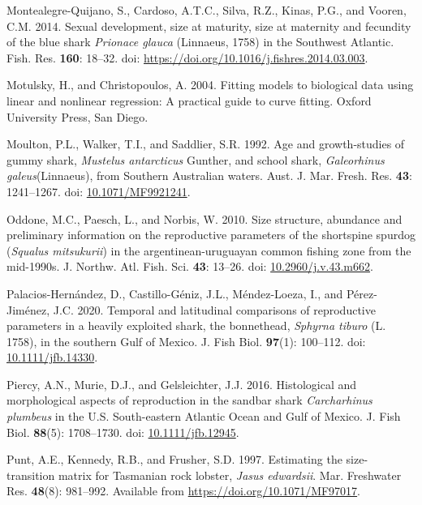 \documentclass[
]{article}
\newenvironment{CSLReferences}%
  {}%
  {\par}
\begin{document}
\begin{CSLReferences}{1}{0}
Montealegre-Quijano, S., Cardoso, A.T.C., Silva, R.Z., Kinas, P.G., and Vooren, C.M. 2014. Sexual development, size at maturity, size at maternity and fecundity of the blue shark \emph{{Prionace} glauca} ({Linnaeus}, 1758) in the {Southwest} {Atlantic}. Fish. Res. \textbf{160}: 18--32. doi: \url{https://doi.org/10.1016/j.fishres.2014.03.003}.

Motulsky, H., and Christopoulos, A. 2004. Fitting models to biological data using linear and nonlinear regression: A practical guide to curve fitting. Oxford University Press, San Diego.

Moulton, P.L., Walker, T.I., and Saddlier, S.R. 1992. Age and growth-studies of gummy shark, \emph{{Mustelus} antarcticus} {Gunther}, and school shark, \emph{{Galeorhinus} galeus}({Linnaeus}), from {Southern} {Australian} waters. Aust. J. Mar. Fresh. Res. \textbf{43}: 1241--1267. doi: \href{https://doi.org/10.1071/MF9921241}{10.1071/MF9921241}.

Oddone, M.C., Paesch, L., and Norbis, W. 2010. Size structure, abundance and preliminary information on the reproductive parameters of the shortspine spurdog (\emph{{Squalus} mitsukurii}) in the argentinean-uruguayan common fishing zone from the mid-1990s. J. Northw. Atl. Fish. Sci. \textbf{43}: 13--26. doi: \href{https://doi.org/10.2960/j.v.43.m662}{10.2960/j.v.43.m662}.

Palacios-Hernández, D., Castillo-Géniz, J.L., Méndez-Loeza, I., and Pérez-Jiménez, J.C. 2020. Temporal and latitudinal comparisons of reproductive parameters in a heavily exploited shark, the bonnethead, \emph{{Sphyrna} tiburo} ({L}. 1758), in the southern {Gulf} of {Mexico}. J. Fish Biol. \textbf{97}(1): 100--112. doi: \href{https://doi.org/10.1111/jfb.14330}{10.1111/jfb.14330}.

Piercy, A.N., Murie, D.J., and Gelsleichter, J.J. 2016. Histological and morphological aspects of reproduction in the sandbar shark \emph{{Carcharhinus} plumbeus} in the {U}.{S}. South-eastern {Atlantic} {Ocean} and {Gulf} of {Mexico}. J. Fish Biol. \textbf{88}(5): 1708--1730. doi: \href{https://doi.org/10.1111/jfb.12945}{10.1111/jfb.12945}.

Punt, A.E., Kennedy, R.B., and Frusher, S.D. 1997. Estimating the size-transition matrix for {Tasmanian} rock lobster, \emph{{Jasus} edwardsii}. Mar. Freshwater Res. \textbf{48}(8): 981--992. Available from \url{https://doi.org/10.1071/MF97017}.


\end{CSLReferences}
\end{document}
